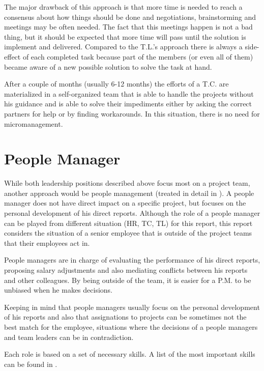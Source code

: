 The major drawback of this approach is that more time is needed to reach a consensus about how things should be done and negotiations, brainstorming and meetings may be often needed. The fact that this meetings happen is not a bad thing, but it should be expected that more time will pass until the solution is implement and delivered. Compared to the T.L.'s approach there is always a side-effect of each completed task because part of the members (or even all of them) became aware of a new possible solution to solve the task at hand. 

After a couple of months (usually 6-12 months) the efforts of a T.C. are materialized in a self-organized team that is able to handle the projects without his guidance and is able to solve their impediments either by asking the correct partners for help or by finding workarounds. In this situation, there is no need for micromanagement.

\section{People Manager}
\label{sec:pm}
While both leadership positions described above focus most on a project team, another approach would be people management (treated in detail in \cite{abur-pm}). A people manager does not have direct impact on a specific project, but focuses on the personal development of his direct reports. Although the role of a people manager can be played from different situation (HR, TC, TL) for this report, this report considers the situation of a senior employee that is outside of the project teams that their employees act in. 

People managers are in charge of evaluating the performance of his direct reports, proposing salary adjustments and also mediating conflicts between his reports and other colleagues. By being outside of the team, it is easier for a P.M. to be unbiased when he makes decisions.

Keeping in mind that people managers usually focus on the personal development of his reports and also that assignations to projects can be sometimes not the best match for the employee, situations where the decisions of a people managers and team leaders can be in contradiction. 

Each role is based on a set of necessary skills. A list of the most important skills can be found in .

